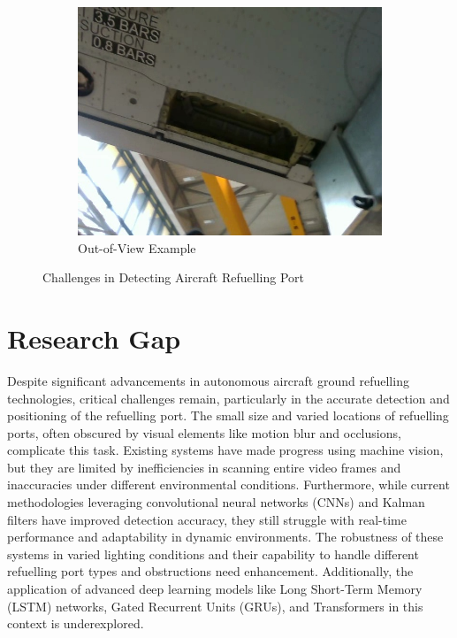 \documentclass[12pt,oneside]{book} %
\begin{document}
\begin{figure}[H]
\begin{subfigure}[b]{0.3\textwidth}
        \includegraphics[height=0.7\textwidth, width=\textwidth]{figures/image_hard_3.jpg}
        \caption{Out-of-View Example}\label{fig:out-of-view-example}
    \end{subfigure}
    \caption{Challenges in Detecting Aircraft Refuelling Port}\label{fig:challenges-detecting-ports}
\end{figure}

\section{Research Gap}
Despite significant advancements in autonomous aircraft ground refuelling
technologies, critical challenges remain, particularly in the accurate
detection and positioning of the refuelling port. The small size and varied
locations of refuelling ports, often obscured by visual elements like motion
blur and occlusions, complicate this task. Existing systems have made progress
using machine vision, but they are limited by inefficiencies in scanning entire
video frames and inaccuracies under different environmental conditions.
Furthermore, while current methodologies leveraging convolutional neural
networks (CNNs) and Kalman filters have improved detection accuracy, they still
struggle with real-time performance and adaptability in dynamic environments.
The robustness of these systems in varied lighting conditions and their
capability to handle different refuelling port types and obstructions need
enhancement. Additionally, the application of advanced deep learning models
like Long Short-Term Memory (LSTM) networks, Gated Recurrent Units (GRUs), and
Transformers in this context is underexplored. 
\end{document}
